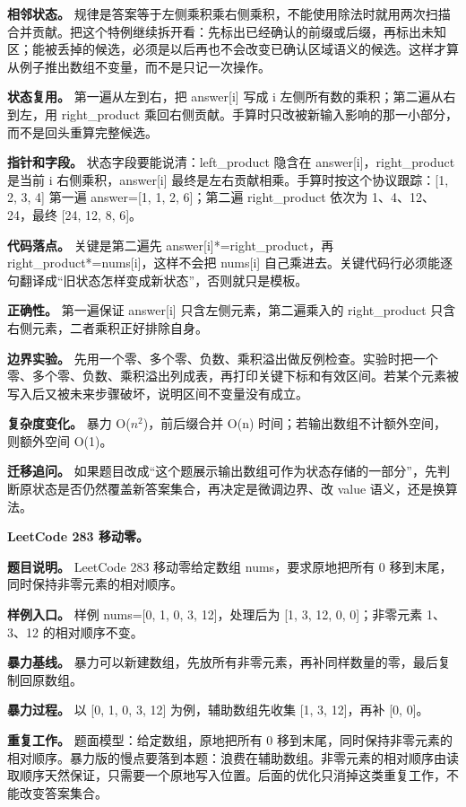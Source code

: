 \textbf{相邻状态。} 规律是答案等于左侧乘积乘右侧乘积，不能使用除法时就用两次扫描合并贡献。把这个特例继续拆开看：先标出已经确认的前缀或后缀，再标出未知区；能被丢掉的候选，必须是以后再也不会改变已确认区域语义的候选。这样才算从例子推出数组不变量，而不是只记一次操作。

\textbf{状态复用。} 第一遍从左到右，把 answer[i] 写成 i 左侧所有数的乘积；第二遍从右到左，用 right\_product 乘回右侧贡献。手算时只改被新输入影响的那一小部分，而不是回头重算完整候选。

\textbf{指针和字段。} 状态字段要能说清：left\_product 隐含在 answer[i]，right\_product 是当前 i 右侧乘积，answer[i] 最终是左右贡献相乘。手算时按这个协议跟踪：[1, 2, 3, 4] 第一遍 answer=[1, 1, 2, 6]；第二遍 right\_product 依次为 1、4、12、24，最终 [24, 12, 8, 6]。

\textbf{代码落点。} 关键是第二遍先 answer[i]*=right\_product，再 right\_product*=nums[i]，这样不会把 nums[i] 自己乘进去。关键代码行必须能逐句翻译成“旧状态怎样变成新状态”，否则就只是模板。

\textbf{正确性。} 第一遍保证 answer[i] 只含左侧元素，第二遍乘入的 right\_product 只含右侧元素，二者乘积正好排除自身。

\textbf{边界实验。} 先用一个零、多个零、负数、乘积溢出做反例检查。实验时把一个零、多个零、负数、乘积溢出列成表，再打印关键下标和有效区间。若某个元素被写入后又被未来步骤破坏，说明区间不变量没有成立。

\textbf{复杂度变化。} 暴力 O(\ensuremath{n^{2}})，前后缀合并 O(n) 时间；若输出数组不计额外空间，则额外空间 O(1)。

\textbf{迁移追问。} 如果题目改成“这个题展示输出数组可作为状态存储的一部分”，先判断原状态是否仍然覆盖新答案集合，再决定是微调边界、改 value 语义，还是换算法。

\noindent\textbf{LeetCode 283 移动零。}

\textbf{题目说明。} LeetCode 283 移动零给定数组 nums，要求原地把所有 0 移到末尾，同时保持非零元素的相对顺序。

\textbf{样例入口。} 样例 nums=[0, 1, 0, 3, 12]，处理后为 [1, 3, 12, 0, 0]；非零元素 1、3、12 的相对顺序不变。

\textbf{暴力基线。} 暴力可以新建数组，先放所有非零元素，再补同样数量的零，最后复制回原数组。

\textbf{暴力过程。} 以 [0, 1, 0, 3, 12] 为例，辅助数组先收集 [1, 3, 12]，再补 [0, 0]。

\textbf{重复工作。} 题面模型：给定数组，原地把所有 0 移到末尾，同时保持非零元素的相对顺序。暴力版的慢点要落到本题：浪费在辅助数组。非零元素的相对顺序由读取顺序天然保证，只需要一个原地写入位置。后面的优化只消掉这类重复工作，不能改变答案集合。

